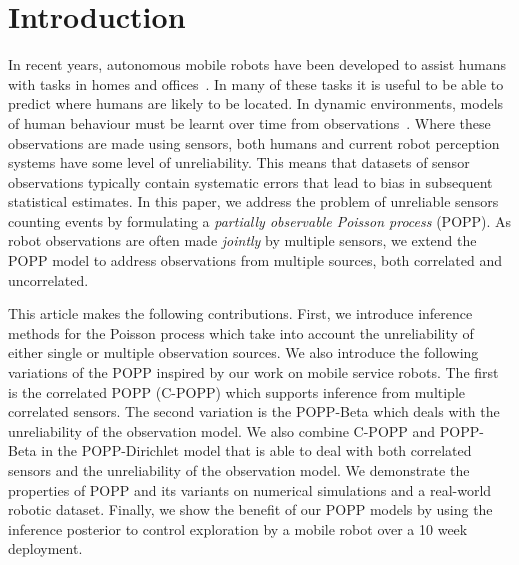 

\section{Introduction}
\label{sec:introduction}

In recent years, autonomous mobile robots have been developed to assist humans with tasks in homes and offices~\cite{hawes2016strands}. In many of these tasks it is useful to be able to predict where humans are likely to be located. In dynamic environments, models of human behaviour must be learnt over time from observations~\cite{coppola2016learning,duckworth2016unsupervised}. Where these observations are made using sensors, both humans and current robot perception systems have some level of unreliability. This means that datasets of sensor observations typically contain systematic errors that lead to bias in subsequent statistical estimates. In this paper, we address the problem of unreliable sensors counting events by formulating a \textit{partially observable Poisson process} (POPP). As robot observations are often made \emph{jointly} by multiple sensors, we extend the POPP model to address observations from multiple sources, both correlated and uncorrelated.

This article makes the following contributions. First, we introduce inference methods for the Poisson process which take into account the unreliability of either single or multiple observation sources. We also introduce the following variations of the POPP inspired by our work on mobile service robots. The first is the correlated POPP (C-POPP) which supports inference from multiple correlated sensors. The second variation is the POPP-Beta which deals with the unreliability of the observation model. We also combine C-POPP and POPP-Beta in the POPP-Dirichlet model that is able to deal with both correlated sensors and the unreliability of the observation model. We demonstrate the properties of POPP and its variants on numerical simulations and a real-world robotic dataset.
% 
Finally, we show the benefit of our POPP models by using the inference posterior to control exploration by a mobile robot over a 10 week deployment.
% 

